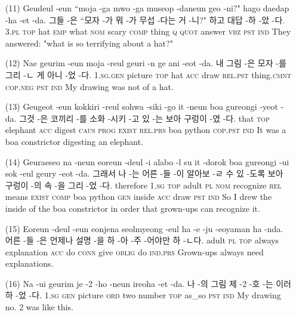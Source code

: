 \begin{itemize}
\item [(11)]
\tgl
		{Geudeul -eun ``moja -ga mwo -ga museop -daneun geo -ni?" hago daedap -ha -et -da.}
		{그들 -은 ``모자 -가 뭐 -가 무섭 -다는 거 -니?" 하고 대답 -하 -았 -다.}
		{\textsc{3.pl} \textsc{top} hat \textsc{emp} what \textsc{nom} scary \textsc{comp} thing \textsc{q} \textsc{quot} answer \textsc{vbz} \textsc{pst} \textsc{ind}}
		{They answered: "what is so terrifying about a hat?"}

\item [(12)]
\tgl
		{Nae geurim -eun moja -reul geuri -n ge ani -eot -da.}
		{내 그림 -은 모자 -를 그리 -ㄴ 게 아니 -었 -다.}
		{\textsc{1.sg.gen} picture \textsc{top} hat \textsc{acc} draw \textsc{rel.pst} thing.\textsc{cmnt} \textsc{cop.neg} \textsc{pst} \textsc{ind}}
		{My drawing was not of a hat.}

\item [(13)]
\tgl
		{Geugeot -eun kokkiri -reul sohwa -siki -go it -neun boa gureongi -yeot -da.}
		{그것 -은 코끼리 -를 소화 -시키 -고 있 -는 보아 구렁이 -였 -다.}
		{that \textsc{top} elephant \textsc{acc} digest \textsc{caus} \textsc{prog} \textsc{exist} \textsc{rel.prs} boa python \textsc{cop.pst} \textsc{ind}}
		{It was a boa constrictor digesting an elephant.}

\item [(14)]
\tgl
		{Geuraeseo na -neun eoreun -deul -i alabo -l su it -dorok boa gureongi -ui sok -eul geury -eot -da.}
		{그래서 나 -는 어른 -들 -이 알아보 -ㄹ 수 있 -도록 보아 구렁이 -의 속 -을 그리 -었 -다.}
		{therefore \textsc{1.sg} \textsc{top} adult \textsc{pl} \textsc{nom} recognize \textsc{rel} means \textsc{exist} \textsc{comp} boa python \textsc{gen} inside \textsc{acc} draw \textsc{pst} \textsc{ind}}
		{So I drew the inside of the boa constrictor in order that grown-ups can recognize it.}

\item [(15)]
\tgl
		{Eoreun -deul -eun eonjena seolmyeong -eul ha -e -ju -eoyaman ha -nda.}
		{어른 -들 -은 언제나 설명 -을 하 -아 -주 -어야만 하 -ㄴ다.}
		{adult \textsc{pl} \textsc{top} always explanation \textsc{acc} do \textsc{conn} give \textsc{oblig} do \textsc{ind.prs}}
		{Grown-ups always need explanations.}

\item [(16)]
\tgl
		{Na -ui geurim je -2 -ho -neun ireoha -et -da.}
		{나 -의 그림 제 -2 -호 -는 이러하 -었 -다.}
		{\textsc{1.sg} \textsc{gen} picture \textsc{ord} two number \textsc{top} as\_so \textsc{pst} \textsc{ind}}
		{My drawing no. 2 was like this.}


\end{itemize}
